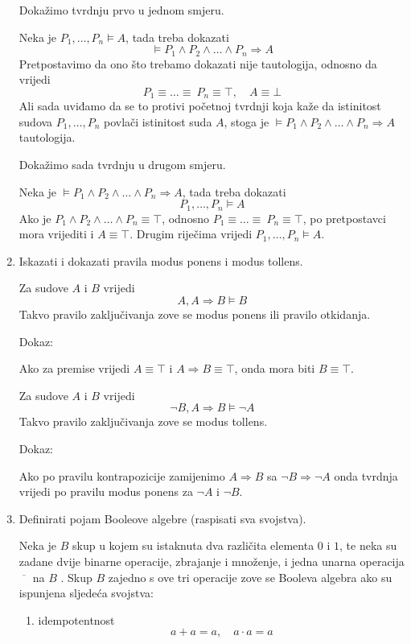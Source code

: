 \documentclass{article}
\begin{document}
\begin{enumerate}
Dokažimo tvrdnju prvo u jednom smjeru.

Neka je $P_1, \ldots, P_n\vDash A$, tada treba dokazati $$\vDash P_1\land P_2\land\ldots\land P_n\Rightarrow A$$ 
Pretpostavimo da ono što trebamo dokazati nije tautologija, odnosno da vrijedi
$$P_1\equiv\ldots\equiv\ P_n\equiv\top,\quad A\equiv\bot$$
Ali sada uviđamo da se to protivi početnoj tvrdnji koja kaže da istinitost sudova $P_1, \ldots, P_n$ povlači istinitost suda $A$, stoga je $\vDash P_1\land P_2\land\ldots\land P_n\Rightarrow A$ tautologija.

Dokažimo sada tvrdnju u drugom smjeru.

Neka je $\vDash P_1\land P_2\land\ldots\land P_n\Rightarrow A$, tada treba dokazati $$P_1, \ldots, P_n\vDash A$$
Ako je $P_1\land P_2\land\ldots\land P_n\equiv\top$, odnosno $P_1\equiv\ldots\equiv\ P_n\equiv\top$, po pretpostavci mora vrijediti i $A\equiv\top$. Drugim riječima vrijedi $P_1, \ldots, P_n\vDash A$.

\item Iskazati i dokazati pravila modus ponens i modus tollens.

Za sudove $A$ i $B$ vrijedi $$A, A\Rightarrow B\vDash B$$ Takvo pravilo zaključivanja zove se modus ponens ili pravilo otkidanja.

Dokaz:

Ako za premise vrijedi $A\equiv\top$ i $A\Rightarrow B\equiv\top$, onda mora biti $B\equiv\top$.

Za sudove $A$ i $B$ vrijedi $$\neg B, A\Rightarrow B\vDash\neg A$$ Takvo pravilo zaključivanja zove se modus tollens.

Dokaz:

Ako po pravilu kontrapozicije zamijenimo $A\Rightarrow B$ sa $\neg B\Rightarrow\neg A$ onda tvrdnja vrijedi po pravilu modus ponens za $\neg A$ i $\neg B$.

\item Definirati pojam Booleove algebre (raspisati sva svojstva).

Neka je $B$ skup u kojem su istaknuta dva različita elementa $0$ i $1$, te neka su zadane dvije binarne operacije, zbrajanje i množenje, i jedna unarna operacija $\overline{\phantom{m}}$ na $B$ . Skup $B$ zajedno s ove tri operacije zove se Booleva algebra ako su ispunjena sljedeća svojstva:

\begin{enumerate}

\item idempotentnost
$$a + a = a,\quad a\cdot a = a$$


\end{enumerate}
\end{enumerate}
\end{document}
